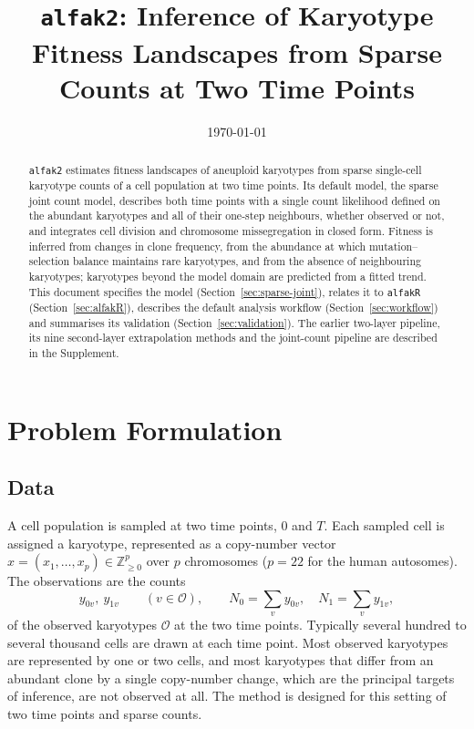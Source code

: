\documentclass[11pt]{article}
\title{\texttt{alfak2}: Inference of Karyotype Fitness Landscapes from Sparse Counts at Two Time Points}
\author{}
\date{\today}
\begin{document}
\maketitle

\begin{abstract}
\texttt{alfak2} estimates fitness landscapes of aneuploid karyotypes from sparse
single-cell karyotype counts of a cell population at two time points. Its
default model, the sparse joint count model, describes both time points with
a single count likelihood
defined on the abundant karyotypes and all of their one-step neighbours,
whether observed or not, and integrates cell division and chromosome
missegregation in closed form. Fitness is inferred from changes in clone
frequency, from the abundance at which mutation--selection balance maintains
rare karyotypes, and from the absence of neighbouring karyotypes; karyotypes
beyond the model domain are predicted from a fitted trend. This document
specifies the model (Section~\ref{sec:sparse-joint}), relates it to
\texttt{alfakR} (Section~\ref{sec:alfakR}), describes the default analysis
workflow (Section~\ref{sec:workflow}) and summarises its validation
(Section~\ref{sec:validation}). The earlier two-layer pipeline, its nine
second-layer extrapolation methods and the joint-count pipeline are described
in the Supplement.
\end{abstract}

\section{Problem Formulation}
\label{sec:setting}

\subsection{Data}

A cell population is sampled at two time points, $0$ and $T$. Each sampled
cell is assigned a karyotype, represented as a copy-number vector
$x=(x_1,\ldots,x_p)\in\mathbb{Z}_{\ge 0}^p$ over $p$ chromosomes ($p=22$ for
the human autosomes). The observations are the counts
\[
  y_{0v},\ y_{1v}\qquad (v\in\mathcal{O}),
  \qquad N_0=\sum_v y_{0v},\quad N_1=\sum_v y_{1v},
\]
of the observed karyotypes $\mathcal{O}$ at the two time points. Typically
several hundred to several thousand cells are drawn at each time point. Most observed karyotypes
are represented by one or two cells, and most karyotypes that differ from an
abundant clone by a single copy-number change, which are the principal targets
of inference, are not observed at all. The method is designed for this
setting of two time points and sparse counts.
\end{document}
